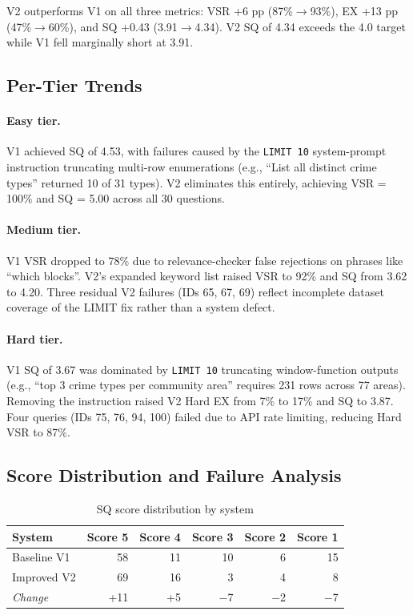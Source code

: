 \documentclass{article}
\begin{document}
V2 outperforms V1 on all three metrics: VSR +6 pp (87\%$\rightarrow$93\%), EX +13 pp (47\%$\rightarrow$60\%), and SQ +0.43 (3.91$\rightarrow$4.34). V2 SQ of 4.34 exceeds the 4.0 target while V1 fell marginally short at 3.91.

\subsection{Per-Tier Trends}

\paragraph{Easy tier.} V1 achieved SQ of 4.53, with failures caused by the \texttt{LIMIT 10} system-prompt instruction truncating multi-row enumerations (e.g., ``List all distinct crime types'' returned 10 of 31 types). V2 eliminates this entirely, achieving VSR = 100\% and SQ = 5.00 across all 30 questions.

\paragraph{Medium tier.} V1 VSR dropped to 78\% due to relevance-checker false rejections on phrases like ``which blocks''. V2's expanded keyword list raised VSR to 92\% and SQ from 3.62 to 4.20. Three residual V2 failures (IDs 65, 67, 69) reflect incomplete dataset coverage of the LIMIT fix rather than a system defect.

\paragraph{Hard tier.} V1 SQ of 3.67 was dominated by \texttt{LIMIT 10} truncating window-function outputs (e.g., ``top 3 crime types per community area'' requires 231 rows across 77 areas). Removing the instruction raised V2 Hard EX from 7\% to 17\% and SQ to 3.87. Four queries (IDs 75, 76, 94, 100) failed due to API rate limiting, reducing Hard VSR to 87\%.

\subsection{Score Distribution and Failure Analysis}

\begin{table}[h]
\centering
\caption{SQ score distribution by system}
\label{tab:sq_dist}
\begin{tabular}{lrrrrr}
\toprule
\textbf{System} & \textbf{Score 5} & \textbf{Score 4} & \textbf{Score 3}
               & \textbf{Score 2} & \textbf{Score 1} \\
\midrule
Baseline V1 & 58 & 11 & 10 & 6 & 15 \\
Improved V2 & 69 & 16 &  3 & 4 &  8 \\
\midrule
\textit{Change} & +11 & +5 & $-$7 & $-$2 & $-$7 \\
\bottomrule
\end{tabular}
\end{table}
\end{document}
